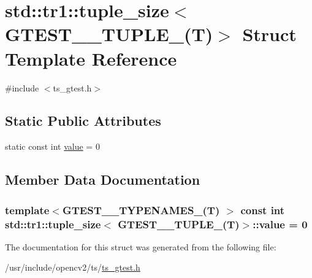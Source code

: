 \hypertarget{structstd_1_1tr1_1_1tuple__size_3_01GTEST__0__TUPLE___07T_08_4}{\section{std\-:\-:tr1\-:\-:tuple\-\_\-size$<$ G\-T\-E\-S\-T\-\_\-\_\-\-T\-U\-P\-L\-E\-\_\-(T)$>$ Struct Template Reference}
\label{structstd_1_1tr1_1_1tuple__size_3_01GTEST__0__TUPLE___07T_08_4}
}


{\ttfamily \#include $<$ts\-\_\-gtest.\-h$>$}

\subsection*{Static Public Attributes}
\begin{DoxyCompactItemize}
\item 
static const int \hyperlink{structstd_1_1tr1_1_1tuple__size_3_01GTEST__0__TUPLE___07T_08_4_a95d9157e7a9e9c49b87f0d8c8ddf25d2}{value} = 0
\end{DoxyCompactItemize}


\subsection{Member Data Documentation}
\hypertarget{structstd_1_1tr1_1_1tuple__size_3_01GTEST__0__TUPLE___07T_08_4_a95d9157e7a9e9c49b87f0d8c8ddf25d2}{
\subsubsection[{value}]{\setlength{\rightskip}{0pt plus 5cm}template$<$G\-T\-E\-S\-T\-\_\-\_\-\-T\-Y\-P\-E\-N\-A\-M\-E\-S\-\_\-(\-T) $>$ const int {\bf std\-::tr1\-::tuple\-\_\-size}$<$ {\bf G\-T\-E\-S\-T\-\_\-\_\-\-T\-U\-P\-L\-E\-\_\-}({\bf T})$>$\-::value = 0\hspace{0.3cm}{\ttfamily [static]}}}\label{structstd_1_1tr1_1_1tuple__size_3_01GTEST__0__TUPLE___07T_08_4_a95d9157e7a9e9c49b87f0d8c8ddf25d2}


The documentation for this struct was generated from the following file\-:\begin{DoxyCompactItemize}
\item 
/usr/include/opencv2/ts/\hyperlink{ts__gtest_8h}{ts\-\_\-gtest.\-h}\end{DoxyCompactItemize}
